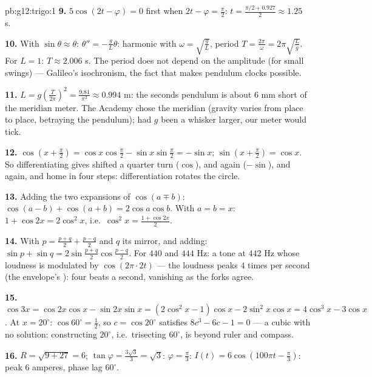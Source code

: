 \begin{solution}{pb:g12:trigo:1}
\textbf{9.} $5\cos(2t - \varphi) = 0$ first when
$2t - \varphi = \frac\pi2$:
$t = \frac{\pi/2 + 0.927}{2} \approx 1.25$ s.

\textbf{10.} With $\sin\theta \approx \theta$:
$\theta'' = -\frac gL \theta$: harmonic with
$\omega = \sqrt{\frac gL}$, period
$T = \frac{2\pi}{\omega} = 2\pi\sqrt{\frac Lg}$. For
$L = 1$: $T \approx 2.006$ s. The period does not depend on
the amplitude (for small swings) --- Galileo's isochronism,
the fact that makes pendulum clocks possible.

\textbf{11.} $L = g\left(\frac{T}{2\pi}\right)^2 =
\frac{9.81}{\pi^2} \approx 0.994$ m: the seconds pendulum is
about $6$ mm short of the meridian meter. The Academy chose
the meridian (gravity varies from place to place, betraying
the pendulum); had $g$ been a whisker larger, our meter would
tick.

\textbf{12.} $\cos\left(x + \frac\pi2\right) =
\cos x \cos\frac\pi2 - \sin x \sin\frac\pi2 = -\sin x$;
$\sin\left(x + \frac\pi2\right) = \cos x$. So differentiating
 gives  shifted a quarter turn ($\cos$), and again
($-\sin$), and again, and home in four steps: differentiation
rotates the circle.

\textbf{13.} Adding the two expansions of $\cos(a \mp b)$:
$\cos(a-b) + \cos(a+b) = 2\cos a\cos b$. With $a = b = x$:
$1 + \cos 2x = 2\cos^2 x$, i.e.\
$\cos^2 x = \frac{1 + \cos 2x}{2}$.

\textbf{14.} With $p = \frac{p+q}{2} + \frac{p-q}{2}$ and
$q$ its mirror,  and adding:
$\sin p + \sin q = 2\sin\frac{p+q}{2}\cos\frac{p-q}{2}$. For
$440$ and $444$ Hz: a tone at $442$ Hz whose loudness is
modulated by $\cos(2\pi \cdot 2t)$ --- the loudness peaks $4$
times per second (the envelope's ): four beats
a second, vanishing as the forks agree.

\textbf{15.} $\cos 3x = \cos 2x\cos x - \sin 2x \sin x =
(2\cos^2 x - 1)\cos x - 2\sin^2 x\cos x = 4\cos^3 x -
3\cos x$. At $x = 20^\circ$: $\cos 60^\circ = \frac12$, so
$c = \cos 20^\circ$ satisfies $8c^3 - 6c - 1 = 0$ --- a cubic
with no  solution: constructing $20^\circ$, i.e.\
trisecting $60^\circ$, is beyond ruler and compass.

\textbf{16.} $R = \sqrt{9 + 27} = 6$;
$\tan\varphi = \frac{3\sqrt3}{3} = \sqrt3$:
$\varphi = \frac\pi3$: $I(t) = 6\cos\left(100\pi t -
\frac\pi3\right)$: peak $6$ amperes, phase lag $60^\circ$.


\end{solution}

